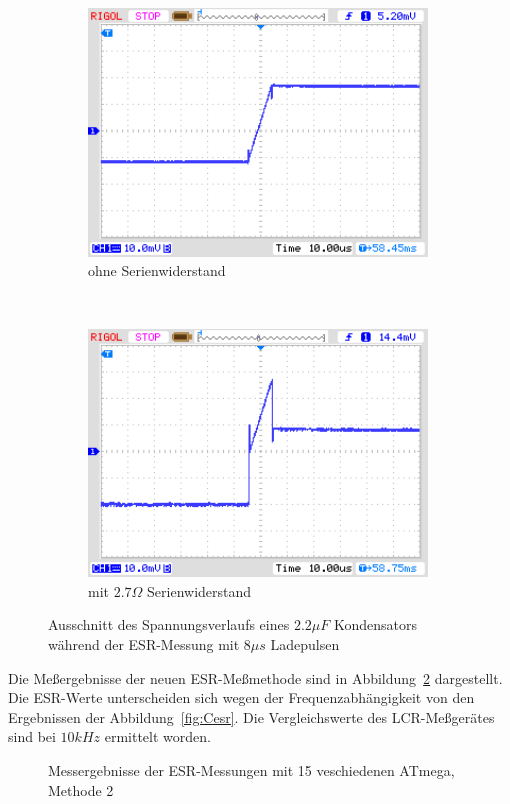 \begin{figure}[H]
  \begin{subfigure}[b]{9cm}
    \centering
    \includegraphics[width=9cm]{../PNG/NewEsr2u2F0R0zoom.png}
    \caption{ohne Serienwiderstand}
  \end{subfigure}
  ~
  \begin{subfigure}[b]{9cm}
    \centering
    \includegraphics[width=9cm]{../PNG/NewEsr2u2F2R7zoom.png}
    \caption{mit \(2.7\Omega\) Serienwiderstand}
  \end{subfigure}
  \caption{Ausschnitt des Spannungsverlaufs eines \(2.2\mu F\) Kondensators während der ESR-Messung mit \(8 \mu s\) Ladepulsen}
  \label{pic:NewEsr2zoom}
\end{figure}
 

Die Meßergebnisse der neuen ESR-Meßmethode sind in Abbildung~\ref{fig:Cesr2} dargestellt.
Die ESR-Werte unterscheiden sich wegen der Frequenzabhängigkeit von den Ergebnissen der Abbildung~\ref{fig:Cesr}.
Die Vergleichswerte des LCR-Meßgerätes sind bei \(10 kHz\) ermittelt worden.

\begin{figure}[H]
\centering

\caption{Messergebnisse der ESR-Messungen mit 15 veschiedenen ATmega, Methode 2}
\label{fig:Cesr2}
\end{figure}

